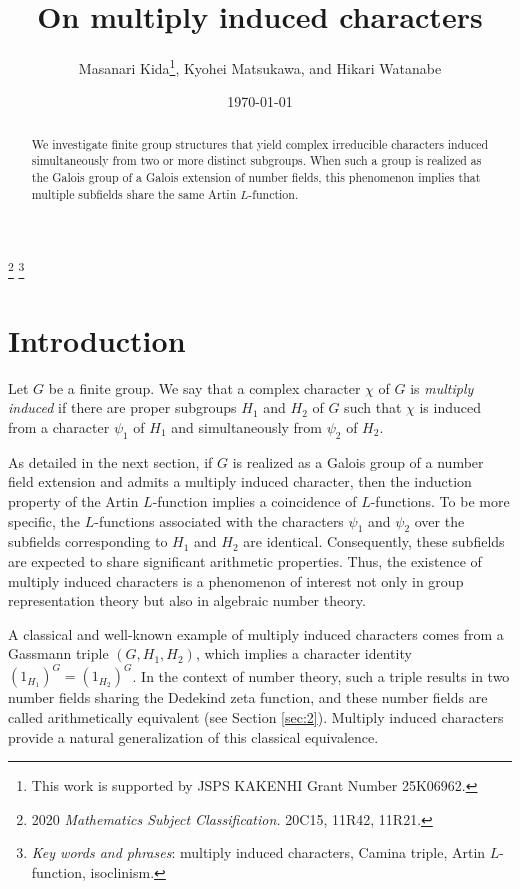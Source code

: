\documentclass[a4paper,12pt]{article}
\theoremstyle{definition}
\theoremstyle{remark}
\numberwithin{equation}{section}
\begin{document}
\title{On multiply induced characters}
\author{Masanari Kida\thanks{This work is supported by JSPS KAKENHI Grant Number 25K06962.}, Kyohei Matsukawa,
 and Hikari Watanabe}
\date{\today}
\maketitle
\renewcommand{\thefootnote}{}
\footnote{2020 \textit{Mathematics Subject Classification.} 20C15, 11R42, 11R21.}
\footnote{\emph{Key words and phrases}: multiply induced characters, Camina triple, Artin $L$-function, isoclinism. }
\renewcommand{\thefootnote}{\arabic{footnote}}
\setcounter{footnote}{0}

\begin{abstract}
    We investigate finite group structures that yield complex irreducible characters induced simultaneously 
    from two or more distinct subgroups. When such a group is realized as the Galois group of a Galois extension
    of number fields, this phenomenon implies that
    multiple subfields share the same Artin $L$-function.
\end{abstract}

\section{Introduction} \label{sec:1}
Let $G$ be a finite group. We say that a complex character $\chi$ of $G$ is \emph{multiply induced}
if there are proper subgroups $H_1$ and $H_2$ of $G$ such that $\chi$ is induced from a character $\psi_1$ 
of $H_1$ and simultaneously from $\psi_2$ of $H_2$.


As detailed in the next section, if $G$ is realized as a Galois group of a number field extension  
and admits a multiply induced character, then the induction property of the Artin $L$-function implies 
a coincidence of $L$-functions. To be more specific,
the $L$-functions associated with the characters $\psi_1$ and $\psi_2$ over the subfields corresponding to $H_1$ and $H_2$  
are identical. Consequently, these subfields are 
expected to  share significant arithmetic properties. Thus, the existence of multiply induced characters
is a phenomenon of interest not only in group representation theory but also in algebraic number theory.

A classical and well-known example of multiply induced characters comes 
from a Gassmann triple $(G,H_1,H_2)$, which implies a character identity
$(1_{H_1})^G = (1_{H_2})^G$. In the context of number theory, 
such a triple results in two
number fields sharing the Dedekind zeta function, and these number fields are called arithmetically 
equivalent (see Section \ref{sec:2}). 
Multiply induced characters provide a natural 
generalization of this classical equivalence.
\end{document}
